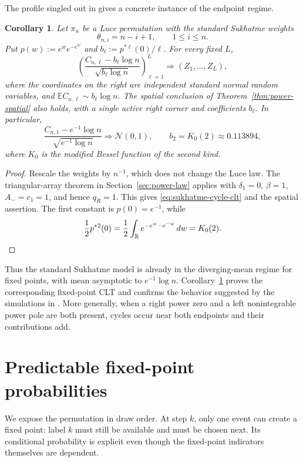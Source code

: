 \documentclass[11pt]{article}
\newtheorem{corollary}[theorem]{Corollary}
\theoremstyle{remark}
\theoremstyle{plain}
\newcommand{\E}{\mathbb E}
\newcommand{\R}{\mathbb R}
\begin{document}
The profile singled out in
\cite[Section~5.2]{borga2025permutonlocallimitsluce} gives a concrete instance
of the endpoint regime.

\begin{corollary}\label{cor:sukhatme}
Let $\pi_n$ be a Luce permutation with the standard Sukhatme weights
\[
 \theta_{n,i}=n-i+1,
 \qquad 1\le i\le n.
\]
Put $p(w):=e^we^{-e^w}$ and
$b_\ell:=p^{*\ell}(0)/\ell$.  For every fixed $L$,
\begin{equation}\label{eq:sukhatme-cycle-clt}
 \left(
 \frac{C_{n,\ell}-b_\ell\log n}{\sqrt{b_\ell\log n}}
 \right)_{\ell=1}^L
 \Longrightarrow (Z_1,\ldots,Z_L),
\end{equation}
where the coordinates on the right are independent standard normal random
variables, and $\E C_{n,\ell}\sim b_\ell\log n$.  The spatial conclusion of
Theorem~\ref{thm:power-spatial} also holds, with a single active right corner
and coefficients $b_\ell$.  In particular,
\[
 \frac{C_{n,1}-e^{-1}\log n}{\sqrt{e^{-1}\log n}}
 \Longrightarrow\mathcal N(0,1),
 \qquad
 b_2=K_0(2)\approx0.113894,
\]
where $K_0$ is the modified Bessel function of the second kind.
\end{corollary}

\begin{proof}
Rescale the weights by $n^{-1}$, which does not change the Luce law.  The
triangular-array theorem in Section~\ref{sec:power-law} applies with
$\delta_1=0$, $\beta=1$, $A_-=c_1=1$, and hence $q_R=1$.  This gives
\eqref{eq:sukhatme-cycle-clt} and the spatial assertion.  The first constant
is $p(0)=e^{-1}$, while
\[
 \frac12p^{*2}(0)
 =\frac12\int_{\R}e^{-e^w-e^{-w}}\,dw=K_0(2).\qedhere
\]
\end{proof}

Thus the standard Sukhatme model is already in the diverging-mean regime for
fixed points, with mean asymptotic to $e^{-1}\log n$.
Corollary~\ref{cor:sukhatme} proves the corresponding fixed-point CLT and
confirms the behavior suggested by the simulations in
\cite[Section~5.2]{borga2025permutonlocallimitsluce}.  More generally, when a
right power zero and a left nonintegrable power pole are both present, cycles
occur near both endpoints and their contributions add.

\section{Predictable fixed-point probabilities}

We expose the permutation in draw order.  At step $k$, only one event can
create a fixed point: label $k$ must still be available and must be chosen
next.  Its conditional probability is explicit even though the fixed-point
indicators themselves are dependent.
\end{document}
